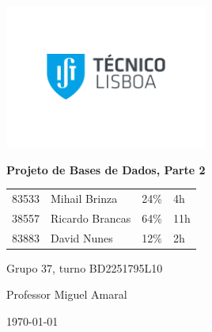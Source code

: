 \documentclass[a4paper]{article}
\begin{document}
    \begin{titlepage}
        \centering
        \includegraphics[width=0.5\textwidth]{IST_A_CMYK_POS.pdf}\par
        {\huge\bfseries Projeto de Bases de Dados, Parte 2\par}
        \vspace{2cm}
        {
        \Large
        \begin{tabular}{llll}
            83533 & Mihail Brinza & 24\% & 4h \\
            38557 & Ricardo Brancas & 64\% & 11h \\
            83883 & David Nunes & 12\% & 2h
        \end{tabular}
        }
        \vfill
        \large
        Grupo 37, turno BD2251795L10 \par
        Professor Miguel Amaral

        \vspace{3cm}

        {\normalsize \today\par}
    \end{titlepage}
\end{document}
